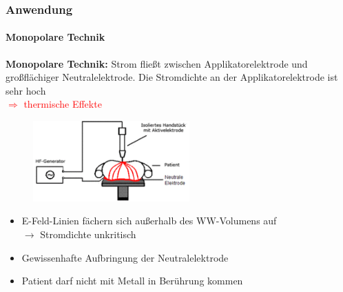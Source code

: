 \documentclass{beamer}
\begin{document}
\begin{frame}
\frametitle{Anwendung}
\framesubtitle{Monopolare Technik}
	\textbf{Monopolare Technik:}
	Strom fließt zwischen Applikatorelektrode und großflächiger Neutralelektrode. Die Stromdichte an der Applikatorelektrode ist sehr hoch
	\\\textcolor{red}{$\Rightarrow$ thermische Effekte}
	\begin{figure}
		\centering
		\includegraphics[width=6cm]{images/_monopolareTechnik.png}
		\cite{wiki:HF}
	\end{figure}
	\begin{itemize}
		\item E-Feld-Linien fächern sich außerhalb des WW-Volumens auf \\$\rightarrow$ Stromdichte unkritisch
		\item Gewissenhafte Aufbringung der Neutralelektrode
		\item Patient darf nicht mit Metall in Berührung kommen
	\end{itemize}

\end{frame}
\end{document}
